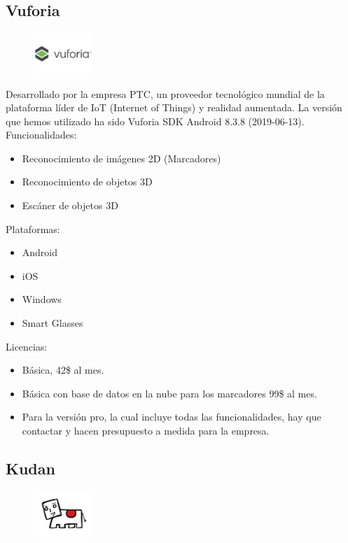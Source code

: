 \subsection{Vuforia}
\begin{figure}[H]
    \centering
    \includegraphics[width=0.2\textwidth]{Images/Vuforia.jpeg}
    \label{fig:Vuforia}
\end{figure}
Desarrollado por la empresa PTC, un proveedor tecnológico mundial de la plataforma líder de IoT (Internet of Things) y realidad aumentada. La versión que hemos utilizado ha sido Vuforia SDK Android 8.3.8 (2019-06-13).\cite{Vuforia}
Funcionalidades:
\begin{itemize}
\item Reconocimiento de imágenes 2D (Marcadores)
\item Reconocimiento de objetos 3D
\item Escáner de objetos 3D
\end{itemize}
Plataformas:
\begin{itemize}
\item Android
\item iOS
\item Windows
\item Smart Glasses
\end{itemize}
Licencias:
\begin{itemize}
\item Básica, 42\$ al mes.
\item Básica con base de datos en la nube para los marcadores 99\$ al mes.
\item Para la versión pro, la cual incluye todas las funcionalidades, hay que contactar y hacen presupuesto a medida para la empresa.
\end{itemize}

\clearpage
\subsection{Kudan}
 \begin{figure}[H]
    \centering
    \includegraphics[width=0.2\textwidth]{Images/Kudan_Logo.png}
    \label{fig:Kudan}
\end{figure}

